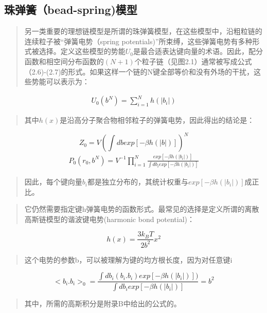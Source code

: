 \subsection{珠弹簧（bead-spring)模型}
\begin{quotation}
另一类重要的理想链模型是所谓的珠弹簧模型，在这些模型中，沿粗粒链的连续粒子被“弹簧电势（spring potentials)”所束缚，这些弹簧电势有多种形式被选择。定义这些模型的势能$U_{0}$是最合适表达键向量的术语。因此，配分函数和相空间分布函数的$(N+1)$个粒子链（见图2.1）通常被写成公式（2.6)-(2.7)的形式。如果这样一个链的N键全部等价和没有外场的干扰，这些势能可以表示为：
\end{quotation} 
\begin{equation}
\begin{split}
U_{0}(b^{N})= \sum_{i=1}^{N}h(|b_{i}|)
\end{split}
\end{equation}
\begin{quotation}
其中$h(x)$是沿高分子聚合物相邻粒子的弹簧电势，因此得出的结论是：
\end{quotation}
\begin{equation}
Z_{0}=V(\int db exp[-\beta h(|b|)])^N 
\end{equation}
\begin{equation}
\begin{split}		
P_{0} (r_{0},b^N) =V^{-1} \prod_{i=1}^{N} \frac{exp[-\beta h(|b_{i}|)]}{\int d b_{i}exp[-\beta h(|b_{i}|)]}
\end{split}
\end{equation}
\begin{quotation}
因此，每个键向量$b_{i}$都是独立分布的，其统计权重与$exp[-\beta h(|b_{i}|)]$成正比。 
\end{quotation}
\begin{quotation}
它仍然需要指定键h弹簧电势的函数形式。最常见的选择是定义所谓的离散高斯链模型的谐波键电势(harmonic bond potential)： 
\end{quotation}
\begin{equation}
h(x)=\frac{3k_{B}T}{2b^2} x^2  
\end{equation}
\begin{quotation}
这个电势的参数b，可以被理解为键的均方根长度，因为对任意键i 
\end{quotation}
\begin{equation}
<b_{i}.b_{i}>_{0}= \frac{\int db_{i}(b_{i}.b_{i})exp[-\beta h(|b_{i}|)])}{\int db_{i}exp[-\beta h(|b_{i}|)]}=b^2
\end{equation}
\begin{quotation}
其中，所需的高斯积分是附录B中给出的公式的。
\end{quotation}
